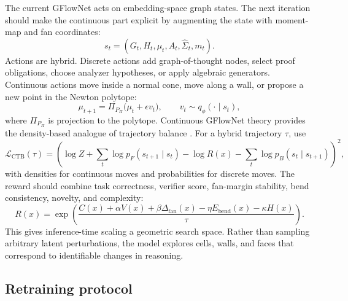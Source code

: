 \documentclass[11pt]{article}
\theoremstyle{definition}
\theoremstyle{plain}
\theoremstyle{remark}
\numberwithin{equation}{section}
\begin{document}
The current GFlowNet acts on embedding-space graph states.  The next iteration should make the continuous part explicit by augmenting the state with moment-map and fan coordinates:
\begin{equation}
  s_t=(G_t,H_t,\mu_t,A_t,\widehat\Sigma_t,m_t).
\end{equation}
Actions are hybrid.  Discrete actions add graph-of-thought nodes, select proof obligations, choose analyzer hypotheses, or apply algebraic generators.  Continuous actions move inside a normal cone, move along a wall, or propose a new point in the Newton polytope:
\begin{equation}
  \mu_{t+1}=\Pi_{P_\Pi}\bigl(\mu_t+\epsilon v_t\bigr),
  \qquad v_t\sim q_\phi(\cdot\mid s_t),
\end{equation}
where $\Pi_{P_\Pi}$ is projection to the polytope.  Continuous GFlowNet theory provides the density-based analogue of trajectory balance \cite{lahlou2023continuous}.  For a hybrid trajectory $\tau$, use
\begin{equation}
  \mathcal L_{\mathrm{CTB}}(\tau)=
  \left(
    \log Z+\sum_t\log p_F(s_{t+1}\mid s_t)
    -\log R(x)
    -\sum_t\log p_B(s_t\mid s_{t+1})
  \right)^2,
\end{equation}
with densities for continuous moves and probabilities for discrete moves.  The reward should combine task correctness, verifier score, fan-margin stability, bend consistency, novelty, and complexity:
\begin{equation}
  R(x)=\exp\left(
    \frac{
      C(x)+\alpha V(x)+\beta\Delta_{\mathrm{fan}}(x)
      -\eta E_{\mathrm{bend}}(x)-\kappa H(x)
    }{\tau}
  \right).
\end{equation}
This gives inference-time scaling a geometric search space.  Rather than sampling arbitrary latent perturbations, the model explores cells, walls, and faces that correspond to identifiable changes in reasoning.

\subsection{Retraining protocol}
\end{document}
